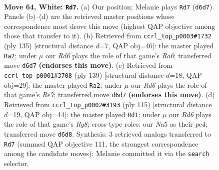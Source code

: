 \documentclass[11pt]{article}
\begin{document}
\clearpage

\begin{figure}[p]\centering
\begin{subfigure}{0.46\textwidth}\centering
\resizebox{\linewidth}{!}{%
\newchessgame
\chessboard[
  setfen={8/6p1/3R1pk1/N6p/3P3P/2r3PK/8/8 w - - 21 64},
  showmover=false,
  pgfstyle=straightmove, color=movearrow, markmove={d6-d7}
]}
\caption{}
\end{subfigure}\hfill
\begin{subfigure}{0.46\textwidth}\centering
\resizebox{\linewidth}{!}{%
\newchessgame
\chessboard[
  setfen={R7/8/6pk/p6p/7P/r4PK1/6P1/8 b - - 9 68},
  showmover=false,
  pgfstyle=straightmove, color=movearrow, markmove={a3-a2}
]}
\caption{}
\end{subfigure}
\\[4pt]
\begin{subfigure}{0.46\textwidth}\centering
\resizebox{\linewidth}{!}{%
\newchessgame
\chessboard[
  setfen={8/8/4pk2/6p1/6Pp/7P/4rPK1/1R6 b - - 28 70},
  showmover=false,
  pgfstyle=straightmove, color=movearrow, markmove={e2-a2}
]}
\caption{}
\end{subfigure}\hfill
\begin{subfigure}{0.46\textwidth}\centering
\resizebox{\linewidth}{!}{%
\newchessgame
\chessboard[
  setfen={8/2R2pk1/6p1/7p/4PK1P/5PP1/8/6r1 b - - 26 58},
  showmover=false,
  pgfstyle=straightmove, color=movearrow, markmove={g1-d1}
]}
\caption{}
\end{subfigure}
\caption{\textbf{Move 64, White: \texttt{Rd7}.} (a) Our position; Melanie plays \texttt{Rd7} (\texttt{d6d7}). Panels (b)--(d) are the retrieved master positions whose correspondence most drove this move (highest QAP objective among those that transfer to it). (b) Retrieved from \texttt{ccrl\_top\_p0003\#1732} (ply 135) [structural distance $d$=7, QAP obj=46]: the master played \texttt{Ra2}; under $\mu$ our \emph{Rd6} plays the role of that game's \emph{Ra6}; transferred move \texttt{d6d7} \textbf{(endorses this move)}. (c) Retrieved from \texttt{ccrl\_top\_p0001\#3708} (ply 139) [structural distance $d$=18, QAP obj=29]: the master played \texttt{Ra2}; under $\mu$ our \emph{Rd6} plays the role of that game's \emph{Re7}; transferred move \texttt{d6d7} \textbf{(endorses this move)}. (d) Retrieved from \texttt{ccrl\_top\_p0002\#3193} (ply 115) [structural distance $d$=19, QAP obj=44]: the master played \texttt{Rd1}; under $\mu$ our \emph{Rd6} plays the role of that game's \emph{Rg8}; cross-type roles: our \emph{N}a5 as their \emph{p}e4; transferred move \texttt{d6d8}. Synthesis: 3 retrieved analogs transferred to \texttt{Rd7} (summed QAP objective 111, the strongest correspondence among the candidate moves); Melanie committed it via the \texttt{search} selector.}
\label{fig:thought-m126}
\end{figure}
\end{document}
